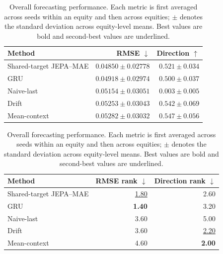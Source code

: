 \begin{table}[t]
\centering
\small
\caption{Overall forecasting performance. Each metric is first averaged across seeds within an equity and then across equities; $\pm$ denotes the standard deviation across equity-level means. Best values are bold and second-best values are underlined.}
\label{tab:main_metrics}
\begin{tabular}{lrr}
\toprule
Method & RMSE $\downarrow$ & Direction $\uparrow$ \\
\midrule
Shared-target JEPA--MAE & \textbf{$0.04850 \pm 0.02778$} & $0.521 \pm 0.034$ \\
GRU & \underline{$0.04918 \pm 0.02974$} & $0.500 \pm 0.037$ \\
Naive-last & $0.05154 \pm 0.03051$ & $0.003 \pm 0.005$ \\
Drift & $0.05253 \pm 0.03043$ & \underline{$0.542 \pm 0.069$} \\
Mean-context & $0.05282 \pm 0.03032$ & \textbf{$0.547 \pm 0.056$} \\
\bottomrule
\end{tabular}
\par\medskip
\begin{tabular}{lrr}
\toprule
Method & RMSE rank $\downarrow$ & Direction rank $\downarrow$ \\
\midrule
Shared-target JEPA--MAE & \underline{1.80} & 2.60 \\
GRU & \textbf{1.40} & 3.20 \\
Naive-last & 3.60 & 5.00 \\
Drift & 3.60 & \underline{2.20} \\
Mean-context & 4.60 & \textbf{2.00} \\
\bottomrule
\end{tabular}
\end{table}

